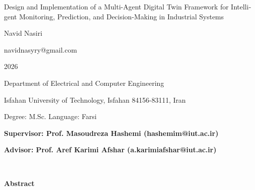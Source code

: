 \documentclass[a4paper,fleqn]{report}
\begin{document}
\begin{latin}
\begin{center}

{\huge Design and Implementation of a Multi-Agent Digital Twin Framework for Intelligent Monitoring, Prediction, and Decision-Making in Industrial Systems}

\vspace{1cm}

{\LARGE{Navid Nasiri}}

\vspace{0.2cm}

{\small navidnasyry@gmail.com}

\vspace{0.5cm}

2026

\vspace{0.5cm}

Department of Electrical and Computer Engineering

\vspace{0.2cm}

Isfahan University of Technology, Isfahan 84156-83111, Iran

\vspace{0.2cm}

Degree: M.Sc. \hspace*{3cm} Language: Farsi

\vspace{1cm}

{\small\textbf{Supervisor: Prof. Masoudreza Hashemi (hashemim@iut.ac.ir)}}

{\small\textbf{Advisor: Prof. Aref Karimi Afshar (a.karimiafshar@iut.ac.ir)}}
\end{center}
~\vfill


\noindent\textbf{Abstract}

\begin{small}
\baselineskip=0.6cm


\end{small}
\end{latin}
\end{document}
